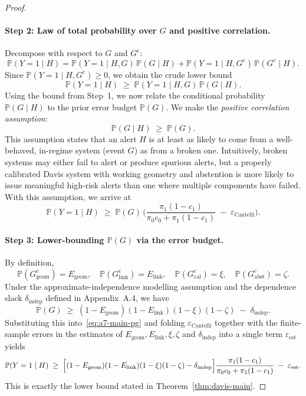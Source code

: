 \documentclass[11pt]{article}
\theoremstyle{remark}
\theoremstyle{plain}
\begin{document}
\begin{proof}
\paragraph{Step 2: Law of total probability over $G$ and positive correlation.}
Decompose with respect to $G$ and $G^{\mathrm{c}}$:
\[
\mathbb{P}(Y = 1 \mid H)
=
\mathbb{P}(Y = 1 \mid H, G)\,\mathbb{P}(G \mid H)
+
\mathbb{P}(Y = 1 \mid H, G^{\mathrm{c}})\,\mathbb{P}(G^{\mathrm{c}} \mid H).
\]
Since $\mathbb{P}(Y = 1 \mid H, G^{\mathrm{c}}) \ge 0$, we obtain the crude lower bound
\begin{equation}
\mathbb{P}(Y = 1 \mid H)
\;\ge\;
\mathbb{P}(Y = 1 \mid H, G)\,\mathbb{P}(G \mid H).
\label{eq:a7-ltp}
\end{equation}
Using the bound from Step~1, we now relate the conditional probability
$\mathbb{P}(G \mid H)$ to the prior error budget $\mathbb{P}(G)$. We make
the \emph{positive correlation assumption}:
\begin{equation}
\mathbb{P}(G \mid H) \;\ge\; \mathbb{P}(G).
\label{eq:positive-correlation}
\end{equation}
This assumption states that an alert $H$ is at least as likely to come from
a well-behaved, in-regime system (event $G$) as from a broken one. Intuitively,
broken systems may either fail to alert or produce spurious alerts, but a properly
calibrated Davis system with working geometry and abstention is more likely to
issue meaningful high-risk alerts than one where multiple components have failed.
With this assumption, we arrive at
\begin{equation}
\mathbb{P}(Y = 1 \mid H)
\;\ge\;
\mathbb{P}(G)\,
\Biggl(
\frac{\pi_1(1 - c_1)}{\pi_0 c_0 + \pi_1(1 - c_1)}
\;-\; \varepsilon_{\mathrm{Cantelli}}
\Biggr).
\label{eq:a7-main-pg}
\end{equation}

\paragraph{Step 3: Lower-bounding $\mathbb{P}(G)$ via the error budget.}
By definition,
\[
\mathbb{P}(G^{\mathrm{c}}_{\mathrm{geom}}) = E_{\mathrm{geom}},\quad
\mathbb{P}(G^{\mathrm{c}}_{\mathrm{link}}) = E_{\mathrm{link}},\quad
\mathbb{P}(G^{\mathrm{c}}_{\mathrm{cal}}) = \xi,\quad
\mathbb{P}(G^{\mathrm{c}}_{\mathrm{abst}}) = \zeta.
\]
Under the approximate-independence modelling assumption and the dependence
slack $\delta_{\mathrm{indep}}$ defined in Appendix~A.4, we have
\[
\mathbb{P}(G)
\;\ge\;
(1 - E_{\mathrm{geom}})(1 - E_{\mathrm{link}})(1 - \xi)(1 - \zeta)
\;-\; \delta_{\mathrm{indep}}.
\]
Substituting this into~\eqref{eq:a7-main-pg} and folding
$\varepsilon_{\mathrm{Cantelli}}$ together with the finite-sample errors in the
estimates of $E_{\mathrm{geom}}, E_{\mathrm{link}}, \xi, \zeta$ and $\delta_{\mathrm{indep}}$
into a single term $\varepsilon_{\mathrm{est}}$ yields
\[
\mathbb{P}(Y = 1 \mid H)
\;\ge\;
\Bigl[
(1 - E_{\mathrm{geom}})(1 - E_{\mathrm{link}})(1 - \xi)(1 - \zeta)
- \delta_{\mathrm{indep}}
\Bigr]
\frac{\pi_1(1 - c_1)}{\pi_0 c_0 + \pi_1(1 - c_1)}
\;-\; \varepsilon_{\mathrm{est}}.
\]
This is exactly the lower bound stated in Theorem~\ref{thm:davis-main}.
\end{proof}
\end{document}
